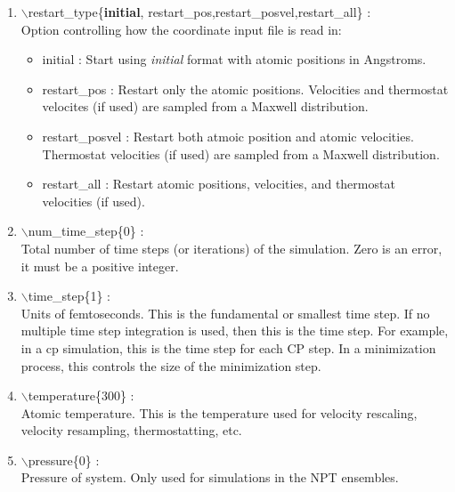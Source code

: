 \documentclass[12pt,titlepage]{article}
\begin{document}
\begin{enumerate}
 \vspace{0.15in} 
 \item  $\backslash$restart\_type\{{\bf initial},
             restart\_pos,restart\_posvel,restart\_all\} : \\
     Option controlling how the coordinate input file is read in:
     \begin{itemize}
       \item { initial} : Start using {\it initial} format 
                                        with atomic positions in Angstroms.
       \item { restart\_pos} : Restart only the atomic positions.
                    Velocities and thermostat velocites (if used) are 
                    sampled from a Maxwell distribution.
       \item { restart\_posvel} :  Restart both atmoic position 
                     and atomic velocities.  Thermostat velocities (if used) 
                     are sampled from a Maxwell distribution.
       \item { restart\_all} : Restart atomic positions, 
                     velocities, and thermostat velocities (if used).
     \end{itemize}



 \vspace{0.15in} 
 \item  $\backslash$num\_time\_step\{0\} : \\
Total number of time steps (or iterations) of the simulation.  Zero is
an error, it must be a positive integer.  

 \vspace{0.15in} 
 \item   $\backslash$time\_step\{1\} : \\
Units of femtoseconds.  This is the fundamental or smallest time
step. If no multiple time step integration is used, then this is the
time step.  For example, in a cp simulation, this is the time step for
each CP step.  In a minimization process, this controls the size of
the minimization step.


 \vspace{0.15in} 
 \item   $\backslash$temperature\{300\} : \\
     Atomic temperature.  This is the temperature used for velocity rescaling,
     velocity resampling, thermostatting, etc.


 \vspace{0.15in} 
 \item   $\backslash$pressure\{0\} : \\
     Pressure of system.  Only used for simulations in the NPT ensembles.


\end{enumerate}
\end{document}
